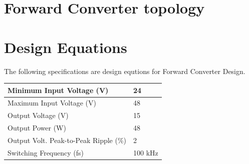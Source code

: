\documentclass{article}
\begin{document}
\section{Forward Converter topology}
\section{Design Equations}
The following specifications are design equtions for Forward Converter Design.
\begin{table}[H]
    \centering
\begin{tabular}{|l|l|}
    \hline
    Minimum Input Voltage (V)             & 24      \\ \hline
    Maximum Input Voltage (V)             & 48      \\ \hline
    Output Voltage (V)                    & 15      \\ \hline
    Output Power (W)                      & 48      \\ \hline
    Output Volt. Peak-to-Peak Ripple (\%) & 2       \\ \hline
    Switching Frequency (fs)              & 100 kHz \\ \hline
\end{tabular}
\end{table}
\end{document}

